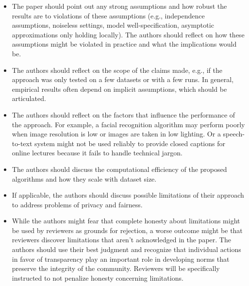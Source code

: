 \begin{enumerate}
\begin{itemize}
        \item The paper should point out any strong assumptions and how robust the results are to violations of these assumptions (e.g., independence assumptions, noiseless settings, model well-specification, asymptotic approximations only holding locally). The authors should reflect on how these assumptions might be violated in practice and what the implications would be.
        \item The authors should reflect on the scope of the claims made, e.g., if the approach was only tested on a few datasets or with a few runs. In general, empirical results often depend on implicit assumptions, which should be articulated.
        \item The authors should reflect on the factors that influence the performance of the approach. For example, a facial recognition algorithm may perform poorly when image resolution is low or images are taken in low lighting. Or a speech-to-text system might not be used reliably to provide closed captions for online lectures because it fails to handle technical jargon.
        \item The authors should discuss the computational efficiency of the proposed algorithms and how they scale with dataset size.
        \item If applicable, the authors should discuss possible limitations of their approach to address problems of privacy and fairness.
        \item While the authors might fear that complete honesty about limitations might be used by reviewers as grounds for rejection, a worse outcome might be that reviewers discover limitations that aren't acknowledged in the paper. The authors should use their best judgment and recognize that individual actions in favor of transparency play an important role in developing norms that preserve the integrity of the community. Reviewers will be specifically instructed to not penalize honesty concerning limitations.
    \end{itemize}


\end{enumerate}
